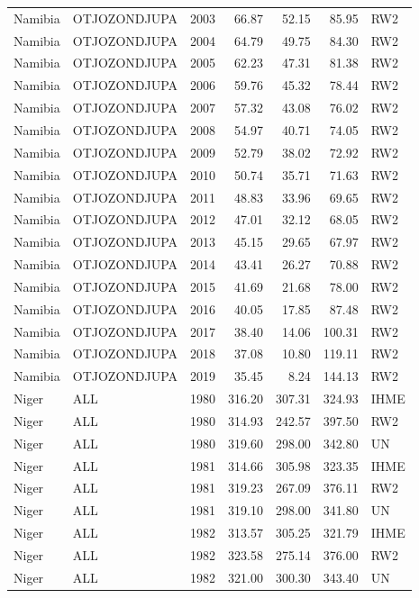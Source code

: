 \begin{longtable}{lllrrrl}
  Namibia & OTJOZONDJUPA & 2003 & 66.87 & 52.15 & 85.95 & RW2 \\ 
  Namibia & OTJOZONDJUPA & 2004 & 64.79 & 49.75 & 84.30 & RW2 \\ 
  Namibia & OTJOZONDJUPA & 2005 & 62.23 & 47.31 & 81.38 & RW2 \\ 
  Namibia & OTJOZONDJUPA & 2006 & 59.76 & 45.32 & 78.44 & RW2 \\ 
  Namibia & OTJOZONDJUPA & 2007 & 57.32 & 43.08 & 76.02 & RW2 \\ 
  Namibia & OTJOZONDJUPA & 2008 & 54.97 & 40.71 & 74.05 & RW2 \\ 
  Namibia & OTJOZONDJUPA & 2009 & 52.79 & 38.02 & 72.92 & RW2 \\ 
  Namibia & OTJOZONDJUPA & 2010 & 50.74 & 35.71 & 71.63 & RW2 \\ 
  Namibia & OTJOZONDJUPA & 2011 & 48.83 & 33.96 & 69.65 & RW2 \\ 
  Namibia & OTJOZONDJUPA & 2012 & 47.01 & 32.12 & 68.05 & RW2 \\ 
  Namibia & OTJOZONDJUPA & 2013 & 45.15 & 29.65 & 67.97 & RW2 \\ 
  Namibia & OTJOZONDJUPA & 2014 & 43.41 & 26.27 & 70.88 & RW2 \\ 
  Namibia & OTJOZONDJUPA & 2015 & 41.69 & 21.68 & 78.00 & RW2 \\ 
  Namibia & OTJOZONDJUPA & 2016 & 40.05 & 17.85 & 87.48 & RW2 \\ 
  Namibia & OTJOZONDJUPA & 2017 & 38.40 & 14.06 & 100.31 & RW2 \\ 
  Namibia & OTJOZONDJUPA & 2018 & 37.08 & 10.80 & 119.11 & RW2 \\ 
  Namibia & OTJOZONDJUPA & 2019 & 35.45 & 8.24 & 144.13 & RW2 \\ 
  Niger & ALL & 1980 & 316.20 & 307.31 & 324.93 & IHME \\ 
  Niger & ALL & 1980 & 314.93 & 242.57 & 397.50 & RW2 \\ 
  Niger & ALL & 1980 & 319.60 & 298.00 & 342.80 & UN \\ 
  Niger & ALL & 1981 & 314.66 & 305.98 & 323.35 & IHME \\ 
  Niger & ALL & 1981 & 319.23 & 267.09 & 376.11 & RW2 \\ 
  Niger & ALL & 1981 & 319.10 & 298.00 & 341.80 & UN \\ 
  Niger & ALL & 1982 & 313.57 & 305.25 & 321.79 & IHME \\ 
  Niger & ALL & 1982 & 323.58 & 275.14 & 376.00 & RW2 \\ 
  Niger & ALL & 1982 & 321.00 & 300.30 & 343.40 & UN \\ 

\end{longtable}
